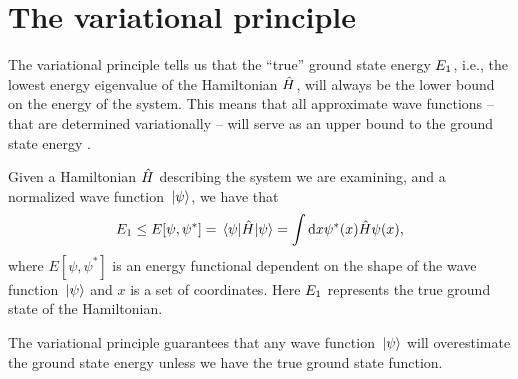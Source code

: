     \section{The variational principle}
        \label{sec:variational-principle}
        The variational principle tells us that the ``true'' ground state energy
        $E_1$, i.e., the lowest energy eigenvalue of the Hamiltonian
        $\hat{H}$, will always be the lower bound on the energy of the system.
        This means that all approximate wave functions -- that are determined
        variationally -- will serve as an upper bound to the ground state energy
        \cite{griffiths2017introduction}.
        \begin{theorem}
            Given a Hamiltonian $\hat{H}$ describing the system we are examining,
            and a normalized wave function $\ket*{\psi}$, we have that
            \begin{align}
                E_1
                \leq
                E[\psi, \psi^{*}]
                = \mel{\psi}{\hat{H}}{\psi}
                = \int\dd x\psi^{*}(x)\hat{H}\psi(x),
                \label{eq:variational-principle}
            \end{align}
            where $E[\psi, \psi^{*}]$ is an energy functional dependent on the shape of
            the wave function $\ket*{\psi}$ and $x$ is a set of coordinates.
            Here $E_1$ represents the true ground state of the
            Hamiltonian.
        \end{theorem}
        The variational principle guarantees that any wave function $\ket*{\psi}$
        will overestimate the ground state energy unless we have the true ground
        state function.
